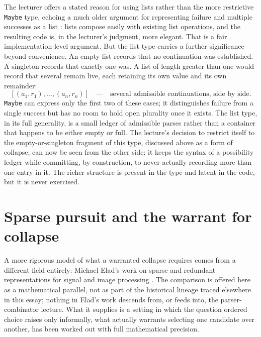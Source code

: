 \documentclass[11pt]{article}
\begin{document}
The lecturer offers a stated reason for using lists rather than the more restrictive \texttt{Maybe} type, echoing a much older argument for representing failure and multiple successes as a list \cite{wadler-1985}: lists compose easily with existing list operations, and the resulting code is, in the lecturer's judgment, more elegant. That is a fair implementation-level argument. But the list type carries a further significance beyond convenience. An empty list records that no continuation was established. A singleton records that exactly one was. A list of length greater than one would record that several remain live, each retaining its own value and its own remainder:
\[
[(a_1, r_1), \ldots, (a_n, r_n)] \quad\text{—}\quad \text{several admissible continuations, side by side.}
\]
\texttt{Maybe} can express only the first two of these cases; it distinguishes failure from a single success but has no room to hold open plurality once it exists. The list type, in its full generality, is a small ledger of admissible parses rather than a container that happens to be either empty or full. The lecture's decision to restrict itself to the empty-or-singleton fragment of this type, discussed above as a form of collapse, can now be seen from the other side: it keeps the syntax of a possibility ledger while committing, by construction, to never actually recording more than one entry in it. The richer structure is present in the type and latent in the code, but it is never exercised.

\section{Sparse pursuit and the warrant for collapse}

A more rigorous model of what a warranted collapse requires comes from a different field entirely: Michael Elad's work on sparse and redundant representations for signal and image processing \cite{elad-2010}. The comparison is offered here as a mathematical parallel, not as part of the historical lineage traced elsewhere in this essay; nothing in Elad's work descends from, or feeds into, the parser-combinator lecture. What it supplies is a setting in which the question ordered choice raises only informally, what actually warrants selecting one candidate over another, has been worked out with full mathematical precision.
\end{document}
